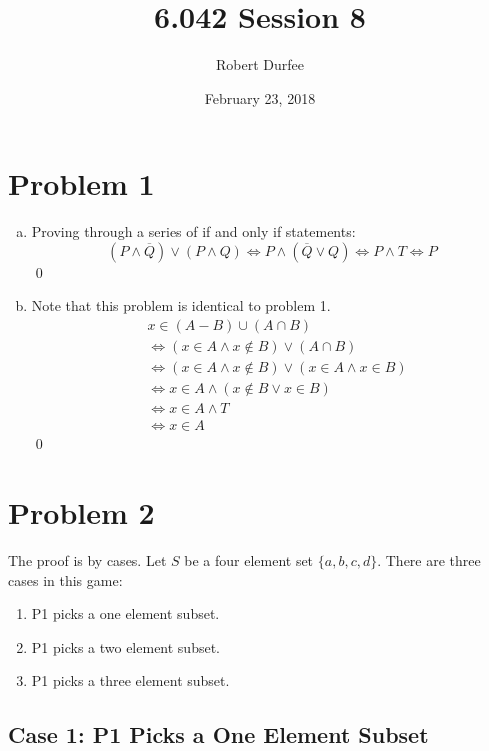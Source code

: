 \documentclass{article}
\title{ 6.042 Session 8 }
\author{ Robert Durfee }
\date{ February 23, 2018 }
\begin{document}
\maketitle

\section*{ Problem 1 }

\begin{enumerate}[a.]

  \item Proving through a series of if and only if statements:
    $$ (P \land \overline{Q}) \lor (P \land Q) \iff P \land (\overline{Q}
    \lor Q) \iff P \land T \iff P $$ \qed

  \item Note that this problem is identical to problem 1.
    \begin{align*}
      &x \in (A - B) \cup (A \cap B) \\
      &\iff (x \in A \land x \notin B) \lor (A \cap B) \\
      &\iff (x \in A \land x \notin B) \lor (x \in A \land x \in B) \\
      &\iff x \in A \land (x \notin B \lor x \in B) \\
      &\iff x \in A \land T \\
      &\iff x \in A
    \end{align*} \qed

\end{enumerate}

\section*{Problem 2}

The proof is by cases. Let $S$ be a four element set $\{a, b, c, d\}$. There are
three cases in this game:

\begin{enumerate}
  \item P1 picks a one element subset.
  \item P1 picks a two element subset.
  \item P1 picks a three element subset.
\end{enumerate}

\subsection*{Case 1: P1 Picks a One Element Subset}
\end{document}
